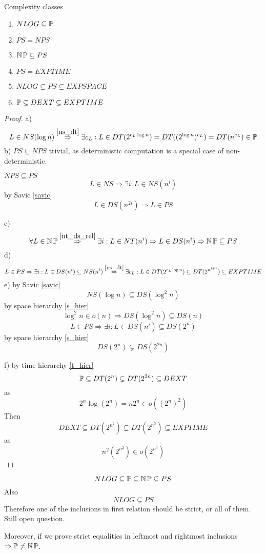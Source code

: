 \begin{theorem}
	Complexity classes
	\begin{enumerate}[label=\alph*)]
		\item $NLOG \subseteq \operatorname{\mathbb{P}}$
		\item $PS = NPS$
		\item $\operatorname{\operatorname{\mathbb{N}}\mathbb{P}} \subseteq PS$
		\item $PS = EXPTIME$
		\item $NLOG \subsetneq PS \subsetneq EXPSPACE$
		\item $\operatorname{\mathbb{P}} \subsetneq DEXT \subsetneq EXPTIME$
	\end{enumerate}
\end{theorem}
\begin{proof}
	a)
	\[ L \in NS(\log n) \stackrel{\cref{ns_dt}}{\Rightarrow} \exists c_L: L \in DT(2^{c_L \log n}) = DT((2^{\log n})^{c_L}) = DT(n^{c_L}) \in \TP \]
	b) $PS \subseteq NPS$ trivial, as deterministic computation is a special case of non-deterministic.

	$NPS \subseteq PS$
	\[ L \in NS \Rightarrow \exists i: L \in NS(n^i) \]
	by Savic \cref{savic}
	\[ L \in DS(n^{2i}) \Rightarrow L \in PS \]

	c)
	\[ \forall L \in \TNP \stackrel{\cref{nt_ds_rel}}{\Rightarrow} \exists i: L \in NT(n^i) \Rightarrow L \in DS(n^i) \Rightarrow \TNP \subseteq PS \]
	d)
	\[ L \in PS \Rightarrow \exists i: L \in DS(n^i) \subseteq NS(n^i) \stackrel{\cref{ns_dt}}{\Rightarrow}\exists c_L: L \in DT(2^{c_L \log n}) \subseteq DT(2^{n^{i + 1}}) \subseteq EXPTIME \]
	e) by Savic \cref{savic}
	\[ NS(\log n) \subseteq DS(\log^2 n) \]
	by space hierarchy \cref{s_hier}
	\[ \log^2 n \in o(n) \Rightarrow DS(\log^2 n) \subsetneq DS(n) \]
	\[ L \in PS \Rightarrow \exists i: L \in DS(n^i) \subseteq DS(2^n) \]
	by space hierarchy \cref{s_hier}
	\[ DS(2^n) \subsetneq DS(2^{2n}) \]

	f)
	by time hierarchy \cref{t_hier}
	\[ \operatorname{\mathbb{P}} \subseteq DT(2^n) \subsetneq DT(2^{2n}) \subseteq DEXT \]
	as
	\[ 2^n \log(2^n) = n 2^n \in o((2^n)^2) \]
	Then
	\[ DEXT \subseteq DT(2^{n^2}) \subsetneq DT(2^{n^3}) \subseteq EXPTIME \]
	as
	\[ n^2 (2^{n^2}) \in o (2^{n^3}) \]
\end{proof}

\begin{note}
	\[ NLOG \subseteq \operatorname{\mathbb{P}} \subseteq \operatorname{\operatorname{\mathbb{N}}\mathbb{P}} \subseteq PS \]
	Also
	\[ NLOG \subsetneq PS \]
	Therefore one of the inclusions in first relation should be strict, or all of them. Still open question.

	Moreover, if we prove strict equalities in leftmost and rightmost inclusions $\Rightarrow \operatorname{\mathbb{P}} \neq \operatorname{\operatorname{\mathbb{N}}\mathbb{P}}$.
\end{note}

